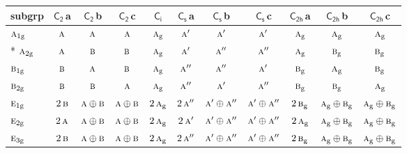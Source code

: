 \documentclass[10pt,a4paper]{article}
\numberwithin{equation}{section}
\newcommand{\grp}[1]{\mathsf{#1}}
\newcommand{\irr}[1]{\text{\normalfont\scshape #1}}
\newcommand{\ptag}[1]{\mathrm{#1}}
\newcommand{\clsletter}[1]{\,{\scriptsize\color{black!55}#1}}
\begin{document}
{\small\begin{longtable}{@{}lcccccccccc@{}}\toprule
subgrp & \href{C2.pdf}{$\grp{C_{2}}$}\clsletter{a} & \href{C2.pdf}{$\grp{C_{2}}$}\clsletter{b} & \href{C2.pdf}{$\grp{C_{2}}$}\clsletter{c} & \href{S2.pdf}{$\grp{C_{i}}$} & \href{C1v.pdf}{$\grp{C_{s}}$}\clsletter{a} & \href{C1v.pdf}{$\grp{C_{s}}$}\clsletter{b} & \href{C1v.pdf}{$\grp{C_{s}}$}\clsletter{c} & \href{C2h.pdf}{$\grp{C_{2h}}$}\clsletter{a} & \href{C2h.pdf}{$\grp{C_{2h}}$}\clsletter{b} & \href{C2h.pdf}{$\grp{C_{2h}}$}\clsletter{c}\\\midrule\endhead
\bottomrule\endfoot\endlastfoot
$\irr{a}_{1\ptag{g}}$ & $\irr{a}$ & $\irr{a}$ & $\irr{a}$ & $\irr{a}_{\ptag{g}}$ & $\irr{a}'$ & $\irr{a}'$ & $\irr{a}'$ & $\irr{a}_{\ptag{g}}$ & $\irr{a}_{\ptag{g}}$ & $\irr{a}_{\ptag{g}}$\\*
$\irr{a}_{2\ptag{g}}$ & $\irr{a}$ & $\irr{b}$ & $\irr{b}$ & $\irr{a}_{\ptag{g}}$ & $\irr{a}'$ & $\irr{a}''$ & $\irr{a}''$ & $\irr{a}_{\ptag{g}}$ & $\irr{b}_{\ptag{g}}$ & $\irr{b}_{\ptag{g}}$\\
$\irr{b}_{1\ptag{g}}$ & $\irr{b}$ & $\irr{a}$ & $\irr{b}$ & $\irr{a}_{\ptag{g}}$ & $\irr{a}''$ & $\irr{a}''$ & $\irr{a}'$ & $\irr{b}_{\ptag{g}}$ & $\irr{a}_{\ptag{g}}$ & $\irr{b}_{\ptag{g}}$\\
$\irr{b}_{2\ptag{g}}$ & $\irr{b}$ & $\irr{b}$ & $\irr{a}$ & $\irr{a}_{\ptag{g}}$ & $\irr{a}''$ & $\irr{a}'$ & $\irr{a}''$ & $\irr{b}_{\ptag{g}}$ & $\irr{b}_{\ptag{g}}$ & $\irr{a}_{\ptag{g}}$\\
$\irr{e}_{1\ptag{g}}$ & $2\,\irr{b}$ & $\irr{a}\oplus \irr{b}$ & $\irr{a}\oplus \irr{b}$ & $2\,\irr{a}_{\ptag{g}}$ & $2\,\irr{a}''$ & $\irr{a}'\oplus \irr{a}''$ & $\irr{a}'\oplus \irr{a}''$ & $2\,\irr{b}_{\ptag{g}}$ & $\irr{a}_{\ptag{g}}\oplus \irr{b}_{\ptag{g}}$ & $\irr{a}_{\ptag{g}}\oplus \irr{b}_{\ptag{g}}$\\
$\irr{e}_{2\ptag{g}}$ & $2\,\irr{a}$ & $\irr{a}\oplus \irr{b}$ & $\irr{a}\oplus \irr{b}$ & $2\,\irr{a}_{\ptag{g}}$ & $2\,\irr{a}'$ & $\irr{a}'\oplus \irr{a}''$ & $\irr{a}'\oplus \irr{a}''$ & $2\,\irr{a}_{\ptag{g}}$ & $\irr{a}_{\ptag{g}}\oplus \irr{b}_{\ptag{g}}$ & $\irr{a}_{\ptag{g}}\oplus \irr{b}_{\ptag{g}}$\\
$\irr{e}_{3\ptag{g}}$ & $2\,\irr{b}$ & $\irr{a}\oplus \irr{b}$ & $\irr{a}\oplus \irr{b}$ & $2\,\irr{a}_{\ptag{g}}$ & $2\,\irr{a}''$ & $\irr{a}'\oplus \irr{a}''$ & $\irr{a}'\oplus \irr{a}''$ & $2\,\irr{b}_{\ptag{g}}$ & $\irr{a}_{\ptag{g}}\oplus \irr{b}_{\ptag{g}}$ & $\irr{a}_{\ptag{g}}\oplus \irr{b}_{\ptag{g}}$\\

\end{longtable}}
\end{document}

